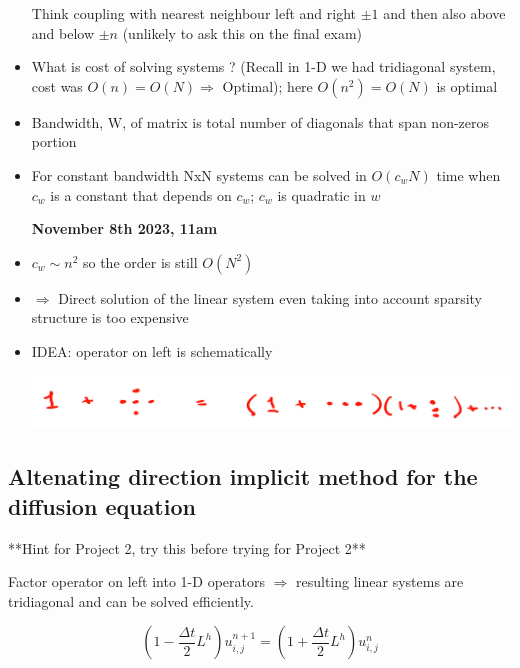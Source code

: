 \begin{itemize}
    Think coupling with nearest neighbour left and right $\pm 1$ and then also above and below $\pm n$ (unlikely to ask this on the final exam)
    
    \item What is cost of solving systems ? (Recall in 1-D we had tridiagonal system, cost was $O(n) = O(N) \Rightarrow$ Optimal); here $O(n^2) = O(N)$ is optimal

    \item Bandwidth, W, of matrix is total number of diagonals that span non-zeros portion

    \item For constant bandwidth NxN systems can be solved in $O(c_w N)$ time when $c_w$ is a constant that depends on $c_w$; $c_w$ is quadratic in $w$

    \textbf{November 8th 2023, 11am}

    \item $c_w \sim n^2$ so the order is still $O(N^2)$ 

    \item $\Rightarrow$ Direct solution of the linear system even taking into account sparsity structure is too expensive

    \item IDEA: operator on left is schematically 

    \includegraphics[width = 0.9 \linewidth]{Images/operator_schematic.png}

    
\end{itemize}

\subsection{Altenating direction implicit method for the diffusion equation}

**Hint for Project 2, try this before trying for Project 2** \newline

Factor operator on left into 1-D operators $\Rightarrow$ resulting linear systems are tridiagonal and can be solved efficiently.

\[ (1-\frac{\Delta t}{2} L^h) u_{i,j}^{n+1} = (1+ \frac{\Delta t}{2} L^h) u_{i,j}^{n}\]

